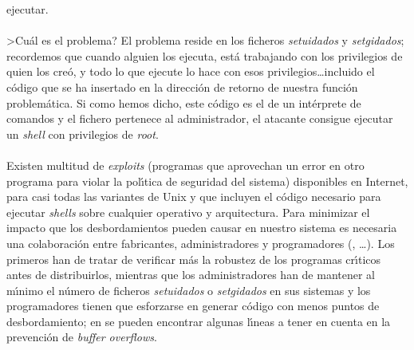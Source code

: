 ejecutar.\\
\\>Cu\'al es el problema? El problema reside en los ficheros {\it setuidados} y
{\it setgidados}; recordemos que cuando alguien los ejecuta, est\'a trabajando
con los privilegios de quien los cre\'o, y todo lo que ejecute lo hace con esos
privilegios\ldots incluido el c\'odigo que se ha insertado en la direcci\'on de
retorno de nuestra funci\'on problem\'atica. Si como hemos dicho, este c\'odigo
es el de un int\'erprete de comandos y el fichero pertenece al administrador, 
el atacante consigue ejecutar un {\it shell} con privilegios de {\it root}.\\
\\Existen multitud de {\it exploits} (programas que aprovechan un error en otro
programa para violar la pol\'{\i}tica de seguridad del sistema) disponibles
en Internet, para casi todas las variantes de Unix y que incluyen el c\'odigo
necesario para ejecutar {\it shells} sobre cualquier operativo y arquitectura.
Para minimizar el impacto que los desbordamientos pueden causar en nuestro
sistema es necesaria una colaboraci\'on entre fabricantes, administradores y
programadores (\cite{kn:ins97}, \cite{kn:smi97}\ldots). Los primeros han de
tratar de verificar m\'as la robustez de los programas cr\'{\i}ticos antes de
distribuirlos, mientras que los administradores han de mantener al m\'{\i}nimo
el n\'umero de ficheros {\it setuidados} o {\it setgidados} en sus sistemas y 
los programadores tienen que esforzarse en generar c\'odigo con menos puntos
de desbordamiento; en \cite{kn:cow00} se pueden encontrar algunas l\'{\i}neas
a tener en cuenta en la prevenci\'on de {\it buffer overflows}.

